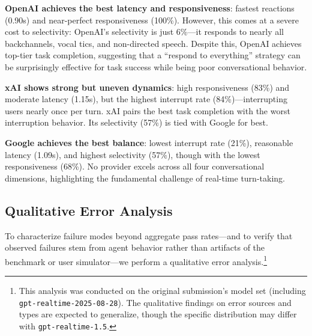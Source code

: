 \textbf{OpenAI achieves the best latency and responsiveness}: fastest reactions (0.90s) and near-perfect responsiveness (100\%). However, this comes at a severe cost to selectivity: OpenAI's selectivity is just 6\%---it responds to nearly all backchannels, vocal tics, and non-directed speech. Despite this, OpenAI achieves top-tier task completion, suggesting that a ``respond to everything'' strategy can be surprisingly effective for task success while being poor conversational behavior.

\textbf{xAI shows strong but uneven dynamics}: high responsiveness (83\%) and moderate latency (1.15s), but the highest interrupt rate (84\%)---interrupting users nearly once per turn. xAI pairs the best task completion with the worst interruption behavior. Its selectivity (57\%) is tied with Google for best.

\textbf{Google achieves the best balance}: lowest interrupt rate (21\%), reasonable latency (1.09s), and highest selectivity (57\%), though with the lowest responsiveness (68\%). No provider excels across all four conversational dimensions, highlighting the fundamental challenge of real-time turn-taking.

\subsection{Qualitative Error Analysis}
\label{sec:analysis}

To characterize failure modes beyond aggregate pass rates---and to verify that observed failures stem from agent behavior rather than artifacts of the benchmark or user simulator---we perform a qualitative error analysis.\footnote{This analysis was conducted on the original submission's model set (including \texttt{gpt-realtime-2025-08-28}). The qualitative findings on error sources and types are expected to generalize, though the specific distribution may differ with \texttt{gpt-realtime-1.5}.}


